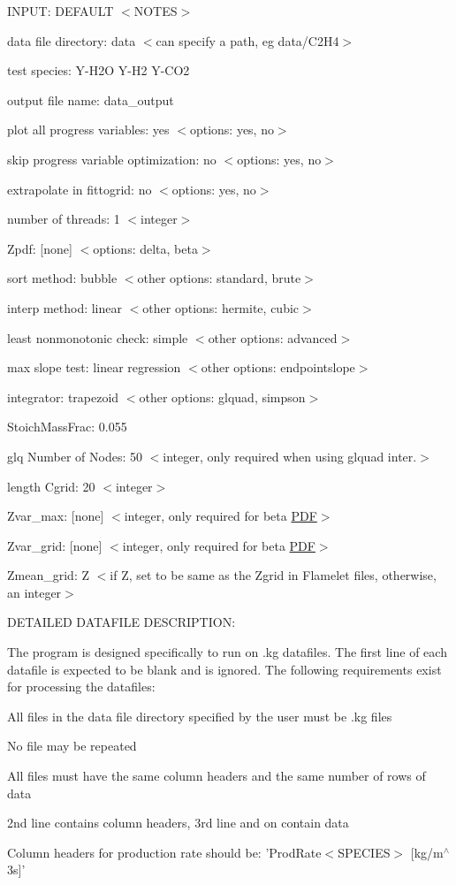 INPUT: DEFAULT $<$NOTES$>$
\begin{DoxyItemize}
\item data file directory: data $<$can specify a path, eg data/C2H4$>$
\item test species: Y-\/H2O Y-\/H2 Y-\/CO2
\item output file name: data\_\-output
\item plot all progress variables: yes $<$options: yes, no$>$
\item skip progress variable optimization: no $<$options: yes, no$>$
\item extrapolate in fittogrid: no $<$options: yes, no$>$
\item number of threads: 1 $<$integer$>$
\item Zpdf: \mbox{[}none\mbox{]} $<$options: delta, beta$>$
\item sort method: bubble $<$other options: standard, brute$>$
\item interp method: linear $<$other options: hermite, cubic$>$
\item least nonmonotonic check: simple $<$other options: advanced$>$
\item max slope test: linear regression $<$other options: endpointslope$>$
\item integrator: trapezoid $<$other options: glquad, simpson$>$
\item StoichMassFrac: 0.055
\item glq Number of Nodes: 50 $<$integer, only required when using glquad inter.$>$
\item length Cgrid: 20 $<$integer$>$
\item Zvar\_\-max: \mbox{[}none\mbox{]} $<$integer, only required for beta \hyperlink{classPDF}{PDF}$>$
\item Zvar\_\-grid: \mbox{[}none\mbox{]} $<$integer, only required for beta \hyperlink{classPDF}{PDF}$>$
\item Zmean\_\-grid: Z $<$if Z, set to be same as the Zgrid in Flamelet files, otherwise, an integer$>$
\end{DoxyItemize}

DETAILED DATAFILE DESCRIPTION:

The program is designed specifically to run on .kg datafiles. The first line of each datafile is expected to be blank and is ignored. The following requirements exist for processing the datafiles:
\begin{DoxyItemize}
\item All files in the data file directory specified by the user must be .kg files
\item No file may be repeated
\item All files must have the same column headers and the same number of rows of data
\item 2nd line contains column headers, 3rd line and on contain data
\item Column headers for production rate should be: 'ProdRate$<$SPECIES$>$ \mbox{[}kg/m$^\wedge$3s\mbox{]}'
\end{DoxyItemize}

